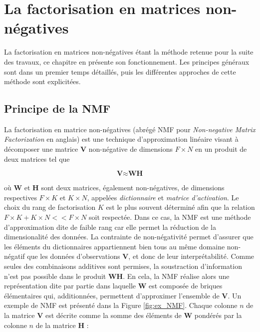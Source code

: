 %
%
%
%
%
\chapter{La factorisation en matrices non-négatives}
La factorisation en matrices non-négatives étant la méthode retenue pour la suite des travaux, ce chapitre en présente son fonctionnement. Les principes généraux sont dans un premier temps détaillés, puis les différentes approches de cette méthode sont explicitées.

\section{Principe de la NMF}
La factorisation en matrice non-négatives (abrégé NMF pour \textit{Non-negative Matrix Factorization} en anglais) est une technique d'approximation linéaire visant à décomposer une matrice $\textbf{V}$ non-négative de dimensions $F \times N$ en un produit de deux matrices tel que

\begin{equation}
\textbf{V} \approx \textbf{WH}
\end{equation}

où $\textbf{W}$ et $\textbf{H}$ sont deux matrices, également non-négatives, de dimensions respectives $F \times K$ et $K \times N$, appelées \textit{dictionnaire} et \textit{matrice d'activation}. Le choix du rang de factorisation $K$ est le plus souvent déterminé afin que la relation $F \times K + K \times N << F \times N$ soit respectée. Dans ce cas, la NMF est une méthode d'approximation dite de faible rang car elle permet la réduction de la dimensionalité des données. La contrainte de non-négativité permet d'assurer que les éléments du dictionnaires appartiennent bien tous au même domaine non-négatif que les données d'observations $\mathbf{V}$, et donc de leur interprétabilité. Comme seules des combinaisons additives sont permises, la soustraction d'information n'est pas possible dans le produit $\mathbf{WH}$. En cela, la NMF réalise alors une représentation dite \og par partie \fg{} dans laquelle $\mathbf{W}$ est composée de briques élémentaires qui, additionnées, permettent d'approximer l'ensemble de $\mathbf{V}$. Un exemple de NMF est présenté dans la Figure \ref{fig:ex_NMF}. Chaque colonne $n$ de la matrice $\mathbf{V}$ est décrite comme la somme des éléments de $\mathbf{W}$ pondérés par la colonne $n$ de la matrice $\mathbf{H}$ :

